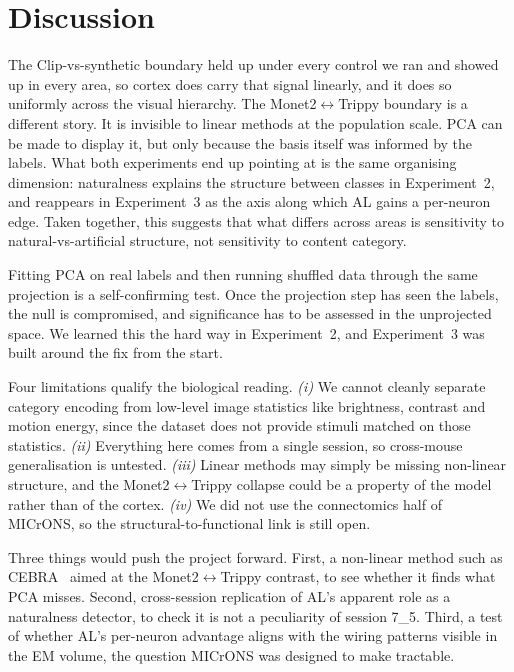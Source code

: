 \documentclass[11pt,a4paper]{article}
\begin{document}
\section{Discussion}
The Clip-vs-synthetic boundary held up under every control we ran and showed up in every area, so cortex does carry that signal linearly, and it does so uniformly across the visual hierarchy. The Monet2$\leftrightarrow$Trippy boundary is a different story. It is invisible to linear methods at the population scale. PCA can be made to display it, but only because the basis itself was informed by the labels. What both experiments end up pointing at is the same organising dimension: naturalness explains the structure between classes in Experiment~2, and reappears in Experiment~3 as the axis along which AL gains a per-neuron edge. Taken together, this suggests that what differs across areas is sensitivity to natural-vs-artificial structure, not sensitivity to content category.

Fitting PCA on real labels and then running shuffled data through the same projection is a self-confirming test. Once the projection step has seen the labels, the null is compromised, and significance has to be assessed in the unprojected space. We learned this the hard way in Experiment~2, and Experiment~3 was built around the fix from the start.

Four limitations qualify the biological reading.
  \emph{(i)} We cannot cleanly separate category encoding from low-level image statistics like brightness, contrast and motion energy, since the dataset does not provide stimuli matched on those statistics.
  \emph{(ii)} Everything here comes from a single session, so cross-mouse generalisation is untested.
  \emph{(iii)} Linear methods may simply be missing non-linear structure, and the Monet2$\leftrightarrow$Trippy collapse could be a property of the model rather than of the cortex.
  \emph{(iv)} We did not use the connectomics half of MICrONS, so the structural-to-functional link is still open.

Three things would push the project forward. First, a non-linear method such as CEBRA~\cite{cebra2023} aimed at the Monet2$\leftrightarrow$Trippy contrast, to see whether it finds what PCA misses. Second, cross-session replication of AL's apparent role as a naturalness detector, to check it is not a peculiarity of session 7\_5. Third, a test of whether AL's per-neuron advantage aligns with the wiring patterns visible in the EM volume, the question MICrONS was designed to make tractable.
\end{document}
